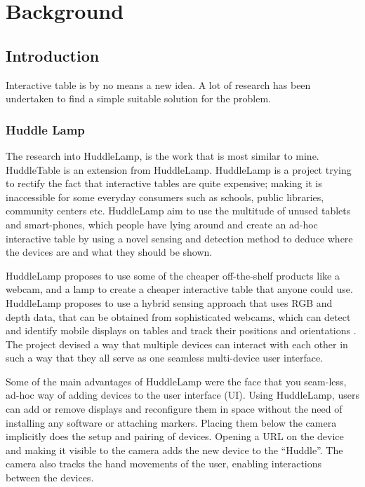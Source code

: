 
\chapter{Background}

\label{ch:background}

\section{Introduction}

Interactive table is by no means a new idea. A lot of research has
been undertaken to find a simple suitable solution for the problem.

\subsection{Huddle Lamp}

The research into HuddleLamp\cite{huddle-link}, is the work that
is most similar to mine. HuddleTable is an extension from HuddleLamp.
HuddleLamp is a project trying to rectify  the fact that interactive
tables are quite expensive; making it is inaccessible for some everyday
consumers such as schools, public libraries, community centers etc.
HuddleLamp aim to use the multitude of unused tablets and smart-phones,
which people have lying around and create an ad-hoc interactive table
by using a novel sensing and detection method to deduce where the
devices are and what they should be shown.

HuddleLamp\cite{huddelamp-paper} proposes to use some of the cheaper
off-the-shelf products like a webcam, and a lamp to create a cheaper
interactive table that anyone could use. HuddleLamp proposes to use
a hybrid sensing approach that uses RGB and depth data, that can be
obtained from sophisticated webcams, which can detect and identify
mobile displays on tables and track their positions and orientations
. The project devised a way that multiple devices can interact with
each other in such a way that they all serve as one seamless multi-device
user interface.

Some of the main advantages of HuddleLamp were the face that you seam-less,
ad-hoc way of adding devices to the user interface (UI). Using HuddleLamp,
users can add or remove displays and reconfigure them in space without
the need of installing any software or attaching markers. Placing
them below the camera implicitly does the setup and pairing of devices.
Opening a URL on the device and making it visible to the camera adds
the new device to the \textquotedblleft Huddle\textquotedblright .
The camera also tracks the hand movements of the user, enabling interactions
between the devices.

